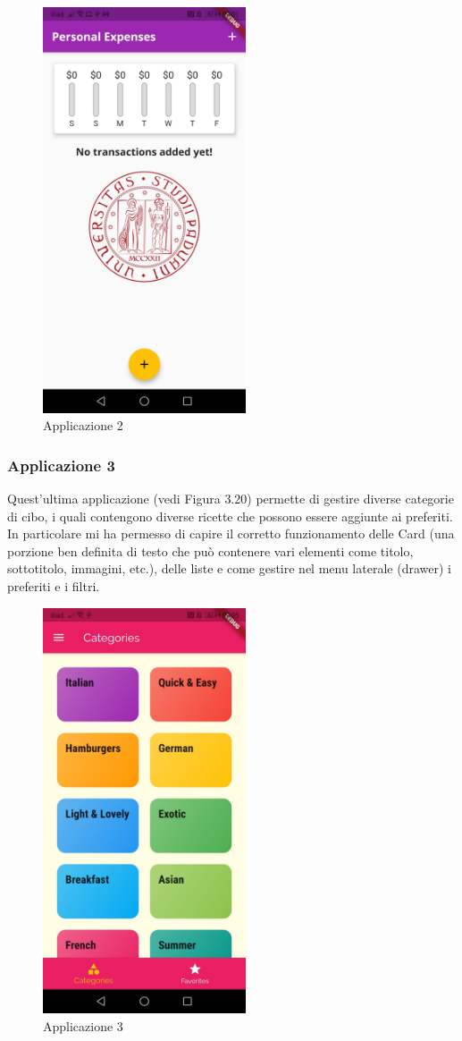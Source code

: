 \begin{figure}[htbp]	
	\centering
	\includegraphics[width=6cm]{immagini/app2.jpeg}
	\caption{Applicazione 2}
	\label{fig:Applicazione 2}
\end{figure}

\newpage

\subsubsection{Applicazione 3}
Quest'ultima applicazione (vedi Figura 3.20) permette di gestire diverse categorie di cibo, i quali contengono diverse ricette che possono essere aggiunte ai preferiti.
In particolare mi ha permesso di capire il corretto funzionamento delle Card \cite{card} (una porzione ben definita di testo che può contenere vari elementi come titolo, sottotitolo, immagini, etc.), delle liste e come gestire nel menu laterale (drawer) i preferiti e i filtri.\\

\begin{figure}[htbp]	
	\centering
	\includegraphics[width=6cm]{immagini/app3.jpeg}
	\caption{Applicazione 3}
	\label{fig:Applicazione 3}
\end{figure}






